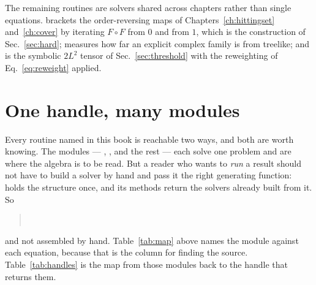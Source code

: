 The remaining routines are solvers shared across chapters rather than single
equations.  brackets the order-reversing maps of
Chapters~\ref{ch:hittingset} and~\ref{ch:cover} by iterating $F\circ F$ from $0$
and from $1$, which is the construction of Sec.~\ref{sec:hard};
 measures how far an explicit complex family is
from treelike; and  is the symbolic $2L^{2}$
tensor of Sec.~\ref{sec:threshold} with the reweighting of
Eq.~\eqref{eq:reweight} applied.

\section*{One handle, many modules}

Every routine named in this book is reachable two ways, and both are worth
knowing. The modules --- , ,  and the
rest --- each solve one problem and are where the algebra is to be read. But a
reader who wants to \emph{run} a result should not have to build a solver by
hand and pass it the right generating function:  holds the
structure once, and its methods return the solvers already built from it. So

\begin{quote}
\small{}\\
\small{}
\end{quote}

\noindent
and not  assembled by hand. Table~\ref{tab:map} above names the module against each equation, because that
is the column for finding the source. Table~\ref{tab:handles} is the map from
those modules back to the handle that returns them.

